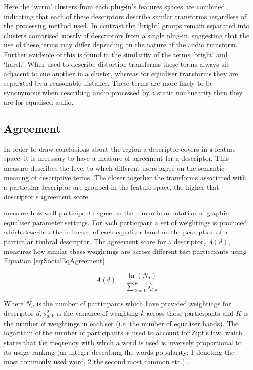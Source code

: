 		Here the `warm' clusters from each plug-in's features spaces are combined, indicating that each of these
		descriptors describe similar transforms regardless of the processing method used. In contrast the `bright'
		groups remain separated into clusters comprised mostly of descriptors from a single plug-in, suggesting
		that the use of these terms may differ depending on the nature of the audio transform.  Further evidence of
		this is found in the similarity of the terms `bright' and `harsh'. When used to describe distortion
		transforms these terms always sit adjacent to one another in a cluster, whereas for equaliser transforms
		they are separated by a reasonable distance. These terms are more likely to be synonymous when describing
		audio processed by a static nonlinearity then they are for equalised audio. 

	\subsection{Agreement}
	\label{sec:TimbreEvaluation-Analysis-Agreement}
		In order to draw conclusions about the region a descriptor covers in a feature space, it is necessary to
		have a measure of agreement for a descriptor. This measure describes the level to which different users
		agree on the semantic meaning of descriptive terms. The closer together the transforms associated with a
		particular descriptor are grouped in the feature space, the higher that descriptor's agreement score.

		\citet{cartwright2013socialeq} measure how well participants agree on the semantic annotation of graphic
		equaliser parameter settings. For each participant a set of weightings is produced which describes the
		influence of each equaliser band on the perception of a particular timbral descriptor. The agreement score
		for a descriptor, $A(d)$, measures how similar these weightings are across different test participants
		using Equation \ref{eq:SocialEqAgreement}.

		\begin{equation}
			A(d) = \frac{\ln(N_{d})}{\sum_{k = 1}^{K} s_{d,k}^{2}}
			\label{eq:SocialEqAgreement}
		\end{equation}

		Where $N_{d}$ is the number of participants which have provided weightings for descriptor $d$,
		$s_{d,k}^{2}$ is the variance of weighting $k$ across those participants and $K$ is the number of
		weightings in each set (i.e. the number of equaliser bands). The logarithm of the number of
		participants is used to account for Zipf's law, which states that the frequency with which a word is used
		is inversely proportional to its usage ranking (an integer describing the words popularity; 1 denoting the
		most commonly used word, 2 the second most common etc.) \citep{manning1999foundations}.


